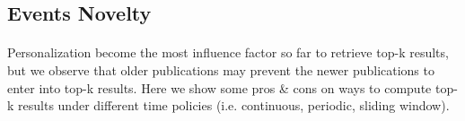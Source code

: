 \documentclass[a4paper,12pt,oneside]{book}
\theoremstyle{definition}
\theoremstyle{remark}
\begin{document}
\subsection{Events Novelty}
\paragraph*{}
Personalization become the most influence factor so far to retrieve top-k results, but we observe that older publications may prevent the newer publications to enter into top-k results. Here we show some pros \& cons on ways to compute top-k results under different time policies (i.e. continuous, periodic, sliding window).
\end{document}
